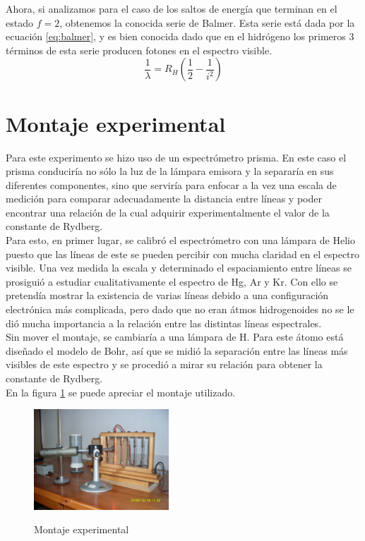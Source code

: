 \documentclass[%
 reprint,
 amsmath,amssymb,
 aps,
]{revtex4-1}
\begin{document}
Ahora, si analizamos para el caso de los saltos de energía que terminan en el estado $f=2$, obtenemos la conocida serie de Balmer. Esta serie está dada por la ecuación \ref{eq:balmer}, y es bien conocida dado que en el hidrógeno los primeros 3 términos de esta serie producen fotones en el espectro visible.\\ 

\begin{equation}
	\frac{1}{\lambda} = R_H\left(\frac{1}{2} - \frac{1}{i^2}\right) 
\label{eq:balmer}
\end{equation}


\section{\label{sec:level1}Montaje experimental}

Para este experimento se hizo uso de un espectrómetro prisma. En este caso el prisma conduciría no sólo la luz de la lámpara emisora y la separaría en sus diferentes componentes, sino que serviría para enfocar a la vez una escala de medición para comparar adecuadamente la distancia entre líneas y poder encontrar una relación de la cual adquirir experimentalmente el valor de la constante de Rydberg. \\

Para esto, en primer lugar, se calibró el espectrómetro con una lámpara de Helio puesto que las líneas de este se pueden percibir con mucha claridad en el espectro visible. Una vez medida la escala y determinado el espaciamiento entre líneas se prosiguió a estudiar cualitativamente el espectro de Hg, Ar y Kr. Con ello se pretendía mostrar la existencia de varias líneas debido a una configuración electrónica más complicada, pero dado que no eran átmos hidrogenoides no se le dió mucha importancia a la relación entre las distintas líneas espectrales. \\

Sin mover el montaje, se cambiaría a una lámpara de H. Para este átomo está diseñado el modelo de Bohr, así que se midió la separación entre las líneas más visibles de este espectro y se procedió a mirar su relación para obtener la constante de Rydberg. \\

En la figura \ref{fig:montaje} se puede apreciar el montaje utilizado.\\

\begin{figure}[h!]
\caption{Montaje experimental}
\centering
\includegraphics[width=0.45\textwidth]{montaje}
\label{fig:montaje}
\end{figure}
\end{document}

